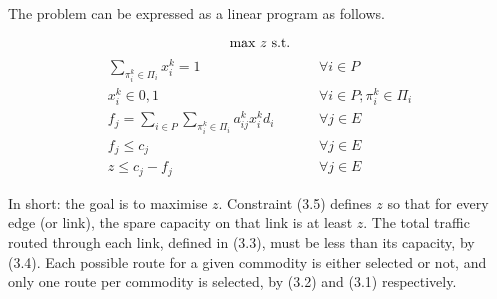 The problem can be expressed as a linear program as follows.

\begin{equation*}
	\text{max } z \text{ s.t.} \\
\end{equation*}
\begin{align}
	\sum_{\pi_i^k \in \Pi_i} x_i^k = 1 \hspace{1cm} &\forall i \in P \\
	x_i^k \in {0,1} \hspace{1cm} &\forall i \in P; \pi_i^k \in \Pi_i \\
	f_j = \sum_{i \in P} \sum_{\pi_i^k \in \Pi_i} a_{ij}^k x_i^k d_i \hspace{1cm} &\forall j \in E \\
	f_j \leq c_j \hspace{1cm} &\forall j \in E \\
	z \leq c_j - f_j \hspace{1cm} &\forall j \in E
\end{align}

In short: the goal is to maximise $z$. Constraint (3.5) defines $z$ so that for every edge (or link), the spare capacity on that link is at least $z$. The total traffic routed through each link, defined in (3.3), must be less than its capacity, by (3.4). Each possible route for a given commodity is either selected or not, and only one route per commodity is selected, by (3.2) and (3.1) respectively.

